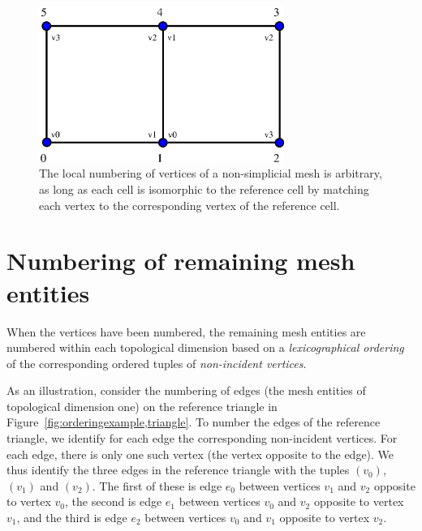 \begin{figure}[htbp]
  \begin{center}
    \includegraphics[width=8cm]{eps/numbering_example_quadrilaterals.eps}
    \caption{The local numbering of vertices of a non-simplicial mesh
      is arbitrary, as long as each cell is isomorphic to the
      reference cell by matching each vertex to the corresponding
      vertex of the reference cell.}
    \label{fig:numbering_example_quadrilaterals}
  \end{center}
\end{figure}

\section{Numbering of remaining mesh entities}

When the vertices have been numbered, the remaining mesh entities are
numbered within each topological dimension based on a
\emph{lexicographical ordering} of the corresponding ordered tuples of
\emph{non-incident vertices}.

As an illustration, consider the numbering of edges (the mesh entities
of topological dimension one) on the reference triangle in
Figure~\ref{fig:orderingexample,triangle}. To number the edges of the
reference triangle, we identify for each edge the corresponding
non-incident vertices. For each edge, there is only one such vertex
(the vertex opposite to the edge). We thus identify the three edges in
the reference triangle with the tuples $(v_0)$, $(v_1)$ and $(v_2)$. The
first of these is edge $e_0$ between vertices $v_1$ and $v_2$ opposite
to vertex $v_0$, the second is edge $e_1$ between vertices $v_0$ and
$v_2$ opposite to vertex $v_1$, and the third is edge $e_2$ between
vertices $v_0$ and $v_1$ opposite to vertex $v_2$.


